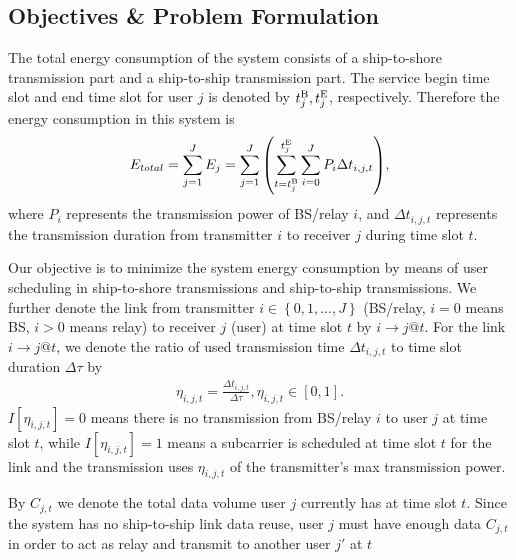 \documentclass[conference]{IEEEtran}
\begin{document}
\subsection{Objectives \& Problem Formulation}

The total energy consumption of the system consists of a ship-to-shore transmission part and a ship-to-ship transmission part. The service begin time slot and end time slot for user $j$ is denoted by $t_j^{{\rm{B}}},t_j^{{\rm{E}}}$, respectively. Therefore the energy consumption in this system is
\begin{align}
  {{E_{total}} = \sum\limits_{j = 1}^J {{E_j}}  = \sum\limits_{j = 1}^J {\left( {\sum\limits_{t = t_j^{{\rm{B}}}}^{t_j^{{\rm{E}}}} {\sum\limits_{i = 0}^J {{P_{i}}\Delta t_{i,j,t} } } } \right)} },
  \end{align}
where ${P_{i}}$ represents the transmission power of BS/relay $i$, and $\Delta t_{i,j,t}$ represents the transmission duration from transmitter $i$ to receiver $j$ during time slot $t$. %

Our objective is to minimize the system energy consumption by means of user scheduling in ship-to-shore transmissions and ship-to-ship transmissions. We further denote the link from transmitter $i \in \left\{ {0,1,...,J} \right\}$ (BS/relay, $i = 0$ means BS, $i > 0$ means relay) to receiver $j$ (user) at time slot $t$ by $i \to j@t$. For the link $i \to j@t$, we denote the ratio of used transmission time $\Delta t_{i,j,t}$ to time slot duration $\Delta \tau$ by 
\begin{align}
  {{\eta _{i,j,t}} = \frac{{\Delta {t_{i,j,t}}}}{{\Delta \tau }},{\eta _{i,j,t}} \in \left[ {0,1} \right]}.
\end{align}
$I\left[ {{\eta _{i,j,t}}} \right] = 0$ means there is no transmission from BS/relay $i$ to user $j$ at time slot $t$, while $I\left[ {{\eta _{i,j,t}}} \right] = 1$ means a subcarrier is scheduled at time slot $t$ for the link and the transmission uses ${\eta _{i,j,t}}$ of the transmitter's max transmission power. 

By ${C_{j,t}}$ we denote the total data volume user $j$ currently has at time slot $t$. Since the system has no ship-to-ship link data reuse, user $j$ must have enough data ${C_{j,t}}$ in order to act as relay and transmit to another user $j'$ at $t$
\end{document}
